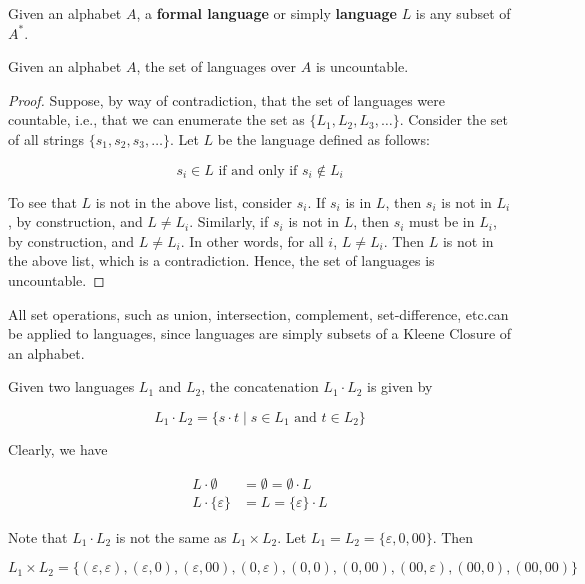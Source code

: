 \begin{definition}
 Given an alphabet \(A\), a \textbf{formal language} or simply \textbf{language} \(L\) is any subset of \(A^*\). 
\end{definition}

\begin{theorem}
 Given an alphabet \(A\), the set of languages over \(A\) is uncountable. 
\end{theorem}

\begin{proof}
 Suppose, by way of contradiction, that the set of languages were countable, i.e., that we can enumerate the set as \( \{L_1, L_2, L_3, \hdots \} \). Consider the set of all strings \( \{s_1, s_2, s_3, \hdots \} \). Let \(L\) be the language defined as follows: 
 
\[s_i\in L\text{ if and only if } s_i\not\in L_i\]

 To see that \(L\) is not in the above list, consider \(s_i\). If \(s_i\) is in \(L\), then \(s_i\) is not in \(L_i\), by construction, and \(L\neq L_i\). Similarly, if \(s_i\) is not in \(L\), then \(s_i\) must be in \(L_i\), by construction, and \(L\neq L_i\). In other words, for all \(i\), \(L\neq L_i\). Then \(L\) is not in the above list, which is a contradiction. Hence, the set of languages is uncountable. 
\end{proof}

All set operations, such as union, intersection, complement, set-difference, etc.\@ can be applied to languages, since languages are simply subsets of a Kleene Closure of an alphabet.

\begin{definition}
 Given two languages \(L_1\) and \(L_2\), the concatenation \(L_1\cdot L_2\) is given by
 
 \[L_1\cdot L_2=\{s\cdot t \mid s\in L_1\text{ and } t\in L_2\} \]
\end{definition}

Clearly, we have 

\begin{align*}
    L\cdot\emptyset &= \emptyset = \emptyset\cdot L\\
    L\cdot \{\varepsilon \} &= L = \{\varepsilon \}\cdot L
\end{align*}

Note that \(L_1\cdot L_2\) is not the same as \(L_1\times L_2\). Let \(L_1=L_2=\{\varepsilon, 0, 00\} \). Then

\[L_1\times L_2=\{(\varepsilon, \varepsilon), (\varepsilon, 0), (\varepsilon, 00), (0, \varepsilon), (0, 0), (0, 00), (00, \varepsilon), (00, 0), (00, 00)\} \]

